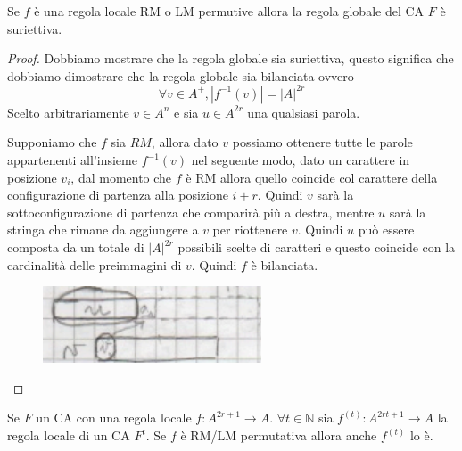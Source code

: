 \begin{teorema}
    Se $f$ è una regola locale RM o LM permutive allora la regola globale del CA 
    $F$ è suriettiva.
    \begin{proof}
        Dobbiamo mostrare che la regola globale sia suriettiva, questo significa
        che dobbiamo dimostrare che la regola globale sia bilanciata ovvero
        $$\forall v \in A^+, |f^{-1}(v)| = |A|^{2r}$$
        Scelto arbitrariamente $v\in A^n$ e sia $u\in A^{2r}$ una qualsiasi parola.
        
        Supponiamo che $f$ sia $RM$, allora dato $v$ possiamo ottenere tutte le parole
        appartenenti all'insieme $f^{-1}(v)$ nel seguente modo, dato un carattere
        in posizione $v_i$, dal momento che $f$ è RM allora quello coincide col
        carattere della configurazione di partenza alla posizione $i+r$. Quindi 
        $v$ sarà la sottoconfigurazione di partenza che comparirà più a destra,
        mentre $u$ sarà la stringa che rimane da aggiungere a $v$ per riottenere $v$.
        Quindi $u$ può essere composta da un totale di $|A|^{2r}$ possibili scelte 
        di caratteri e questo coincide con la cardinalità delle preimmagini di $v$.
        Quindi $f$ è bilanciata.
        \begin{figure}[!h]
            \centering
            \includegraphics[width=.3\textwidth]{img/sistemi_complessi/preimmagini.png}
        \end{figure}
    \end{proof}
\end{teorema}

\begin{teorema}
    Se $F$ un CA con una regola locale $f:A^{2r+1}\rightarrow A$. $\forall t\in \mathbb{N}$
    sia $f^{(t)}:A^{2rt+1}\rightarrow A$ la regola locale di un CA $F^t$. Se $f$
    è RM/LM permutativa allora anche $f^{(t)}$ lo è.
\end{teorema}


